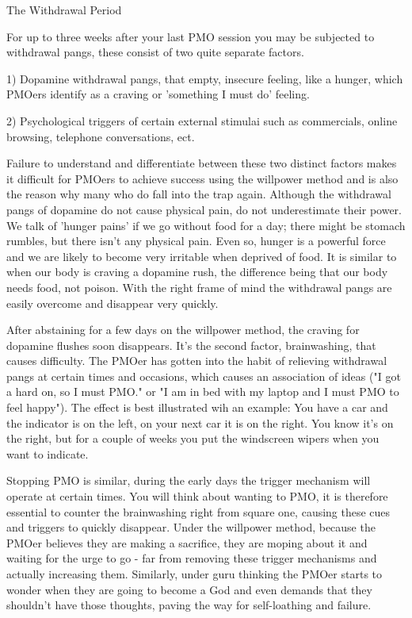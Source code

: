 The Withdrawal Period

For up to three weeks after your last PMO session you may be subjected to withdrawal pangs, these consist of two quite separate factors.

  1) Dopamine withdrawal pangs, that empty, insecure feeling, like a hunger, which PMOers identify as a craving or 'something I must do' feeling.

  2) Psychological triggers of certain external stimulai such as commercials, online browsing, telephone conversations, ect.

Failure to understand and differentiate between these two distinct factors makes it difficult for PMOers to achieve success using the willpower method and is also the reason why many who do fall into the trap again. Although the withdrawal pangs of dopamine do not cause physical pain, do not underestimate their power. We talk of 'hunger pains' if we go without food for a day; there might be stomach rumbles, but there isn't any physical pain. Even so, hunger is a powerful force and we are likely to become very irritable when deprived of food. It is similar to when our body is craving a dopamine rush, the difference being that our body needs food, not poison. With the right frame of mind the withdrawal pangs are easily overcome and disappear very quickly.

After abstaining for a few days on the willpower method, the craving for dopamine flushes soon disappears. It's the second factor, brainwashing, that causes difficulty. The PMOer has gotten into the habit of relieving withdrawal pangs at certain times and occasions, which causes an association of ideas ("I got a hard on, so I must PMO." or "I am in bed with my laptop and I must PMO to feel happy"). The effect is best illustrated wih an example: You have a car and the indicator is on the left, on your next car it is on the right. You know it's on the right, but for a couple of weeks you put the windscreen wipers when you want to indicate.

Stopping PMO is similar, during the early days the trigger mechanism will operate at certain times. You will think about wanting to PMO, it is therefore essential to counter the brainwashing right from square one, causing these cues and triggers to quickly disappear. Under the willpower method, because the PMOer believes they are making a sacrifice, they are moping about it and waiting for the urge to go - far from removing these trigger mechanisms and actually increasing them. Similarly, under guru thinking the PMOer starts to wonder when they are going to become a God and even demands that they shouldn't have those thoughts, paving the way for self-loathing and failure.


